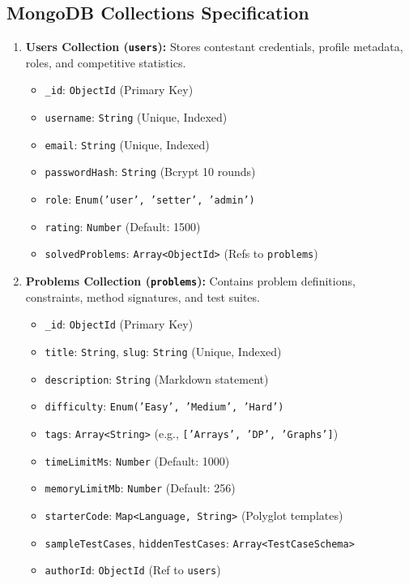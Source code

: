 \documentclass[12pt,a4paper]{report}
\begin{document}
\subsection{MongoDB Collections Specification}
\begin{enumerate}[leftmargin=*, label=\bfseries\arabic*.]
  \item \textbf{Users Collection (\texttt{users}):} Stores contestant credentials, profile metadata, roles, and competitive statistics.
  \begin{itemize}
    \item \texttt{\_id}: \texttt{ObjectId} (Primary Key)
    \item \texttt{username}: \texttt{String} (Unique, Indexed)
    \item \texttt{email}: \texttt{String} (Unique, Indexed)
    \item \texttt{passwordHash}: \texttt{String} (Bcrypt 10 rounds)
    \item \texttt{role}: \texttt{Enum('user', 'setter', 'admin')}
    \item \texttt{rating}: \texttt{Number} (Default: 1500)
    \item \texttt{solvedProblems}: \texttt{Array<ObjectId>} (Refs to \texttt{problems})
  \end{itemize}

  \item \textbf{Problems Collection (\texttt{problems}):} Contains problem definitions, constraints, method signatures, and test suites.
  \begin{itemize}
    \item \texttt{\_id}: \texttt{ObjectId} (Primary Key)
    \item \texttt{title}: \texttt{String}, \texttt{slug}: \texttt{String} (Unique, Indexed)
    \item \texttt{description}: \texttt{String} (Markdown statement)
    \item \texttt{difficulty}: \texttt{Enum('Easy', 'Medium', 'Hard')}
    \item \texttt{tags}: \texttt{Array<String>} (e.g., \texttt{['Arrays', 'DP', 'Graphs']})
    \item \texttt{timeLimitMs}: \texttt{Number} (Default: 1000)
    \item \texttt{memoryLimitMb}: \texttt{Number} (Default: 256)
    \item \texttt{starterCode}: \texttt{Map<Language, String>} (Polyglot templates)
    \item \texttt{sampleTestCases}, \texttt{hiddenTestCases}: \texttt{Array<TestCaseSchema>}
    \item \texttt{authorId}: \texttt{ObjectId} (Ref to \texttt{users})
  \end{itemize}


\end{enumerate}
\end{document}
